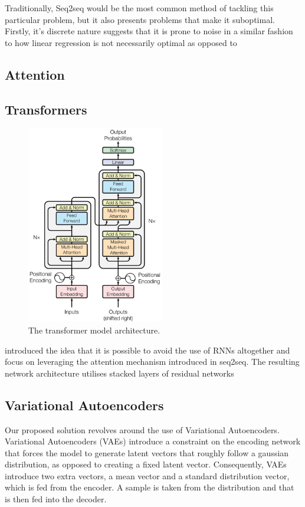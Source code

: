 \documentclass[12pt,twoside]{report}
\begin{document}
Traditionally, Seq2seq would be the most common method of tackling this particular problem, but it also presents problems that make it suboptimal. Firstly, it's discrete nature suggests that it is prone to noise in a similar fashion to how linear regression is not necessarily optimal as opposed to 

\subsection{Attention}

\subsection{Transformers}

\begin{figure}[!ht]
      
	\centering
	\includegraphics[width=60mm]{diagrams/transformers.png}
	\caption{The transformer model architecture.\cite{vaswani_attention_2017} \label{transformer}}
  \end{figure}

\cite{vaswani_attention_2017} introduced the idea that it is possible to avoid the use of RNNs altogether and focus on leveraging the attention mechanism introduced in seq2seq. The resulting network architecture utilises stacked layers of residual networks 

\subsection{Variational Autoencoders}

Our proposed solution revolves around the use of Variational Autoencoders. Variational Autoencoders (VAEs) introduce a constraint on the encoding network that forces the model to generate latent vectors that roughly follow a gaussian distribution, as opposed to creating a fixed latent vector. Consequently, VAEs introduce two extra vectors, a mean vector and a standard distribution vector, which is fed from the encoder. A sample is taken from the distribution and that is then fed into the decoder.
\end{document}
